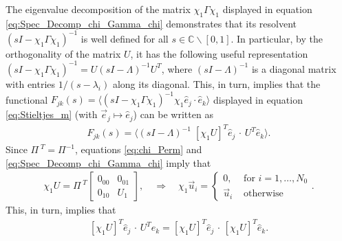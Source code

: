 \documentclass{cmslatex}
\begin{document}
The eigenvalue decomposition of the matrix $\chi_1\Gamma\chi_1$ displayed in
equation \eqref{eq:Spec_Decomp_chi_Gamma_chi} demonstrates that its
resolvent $(sI-\chi_1\Gamma\chi_1)^{-1}$ is well defined for all
$s\in\mathbb{C}\backslash[0,1]$. In particular, by the orthogonality of the
matrix $U$, it has the following useful representation
$(sI-\chi_1\Gamma\chi_1)^{-1}=U(sI-\Lambda)^{-1}U^T$, where $(sI-\Lambda)^{-1}$ is a diagonal
matrix with entries $1/(s-\lambda_i)$ along its diagonal. This, in
turn, implies that the functional
$F_{jk}(s)=\langle(sI-\chi_1\Gamma\chi_1)^{-1}\chi_1\hat{e}_j\cdot\hat{e}_k\rangle$ 
displayed in equation \eqref{eq:Stieltjes_m} (with
$\vec{e}_j\mapsto\hat{e}_j$) can be written as     
%
\begin{align}\label{eq:Matrix_Functional_proof}
  F_{jk}(s)%
          =\langle(sI-\Lambda)^{-1}\;[\chi_1U]^T\hat{e}_j\,\cdot\,U^T\hat{e}_k\rangle. 
\end{align}
%
Since
$\Pi^{\;T}=\Pi^{-1}$, equations \eqref{eq:chi_Perm} and
\eqref{eq:Spec_Decomp_chi_Gamma_chi} imply that
%
\begin{align}\label{eq:Projection_Eigenspace}
  \chi_1U=\Pi^{\;T}\left[
  \begin{array}{ccc}
    0_{00}&0_{01}\\
    0_{10}&U_1  
    \end{array}
\right],
\quad
\Longrightarrow
\quad
\chi_1\vec{u}_i=
  \begin{cases}
  0, &\text{ for } i=1,\ldots,N_0  \\
  \vec{u}_i  &\text{ otherwise}
  \end{cases}.
\end{align}
%
This, in turn, implies that
%
\begin{align}\label{eq:Weights_chi}
  [\chi_1U]^T\hat{e}_j\,\cdot\,U^T\hat{e}_k=[\chi_1U]^T\hat{e}_j\,\cdot\,[\chi_1U]^T\hat{e}_k.
\end{align}
%
\end{document}
